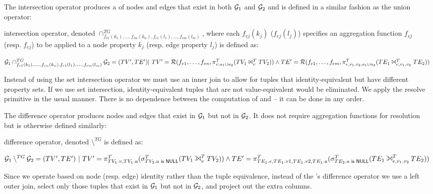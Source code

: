 The \tg intersection operator produces a \tg of nodes and edges that
exist in both $\mathcal{G}_1$ and $\mathcal{G}_2$ and is defined in a similar fashion
as the union operator:

\begin{definition}[Intersection]
\label{def:intertg}
\tg intersection operator, denoted
$\cap^{TG}_{f_{v1}(k_1),\ldots,f_{vn}(k_n),f_{e1}(l_1),\ldots,f_{em}(l_m)}$,
where each $f_{vj}(k_j)$ ($f_{ej}(l_j)$) specifies an aggregation
function $f_{vj}$ (resp. $f_{ej}$) to be applied to a node property
$k_j$ (resp. edge property $l_j$) is defined as:

\noindent $\ttt_1 \cap^{TG}_{f_{v1}(k_1)\varlist f_{vn}(k_n),f_{e1}(l_1)\varlist f_{em}(l_m)} \ttt_2 = (TV', TE') \break |~ TV'=\resolve{f_{v1},\ldots,f_{vn}}{\pi^T_{v,a_1 \cup a_2}(TV_1 \Join^T_{v} TV_2)} \land TE'=\resolve{f_{e1},\ldots,f_{em}}{\pi^T_{e,v_1,v_2,a_1 \cup a_2}(TE_1 \Join^T_{e,v_1,v_2} TE_2)}$
\end{definition}

Instead of using the \tra set intersection operator we must use an
inner join to allow for tuples that identity-equivalent but have
different property sets.  If we use set intersection,
identity-equivalent tuples that are not value-equivalent would be
eliminated.  We apply the resolve primitive in the usual manner.
There is no dependence between the computation of \tv and \te -- it can be
done in any order.

The difference operator produces nodes and edges that exist in
$\mathcal{G}_1$ but not in $\mathcal{G}_2$.  It does not require aggregation
functions for resolution but is otherwise defined similarly:

\begin{definition}[Difference]
\label{def:difftg}
\tg difference operator, denoted
$\setminus^{TG}$ is defined as:

$\ttt_1 \setminus^{TG} \ttt_2 = (TV', TE') ~|~ TV' = \break \pi^T_{TV_1.v,TV_1.a}(\sigma^T_{TV_2.a \textsf{ is NULL}}(TV_1 \leftouterjoin^T_{v} TV_2)) \land TE' = \pi^T_{TE_1.e,TE_1.v1,TE_1.v2,TE_1.a}(\sigma^T_{TE_2.a \textsf{ is NULL}}(TE_1 \leftouterjoin^T_{e,v_1,v_2} TE_2))$

\end{definition}

Since we operate based on node (resp. edge) identity rather than the tuple
equivalence, instead of the \tra's difference operator we use a left
outer join, select only those tuples that exist in $\mathcal{G}_1$ but not in
$\mathcal{G}_2$, and project out the extra columns.

